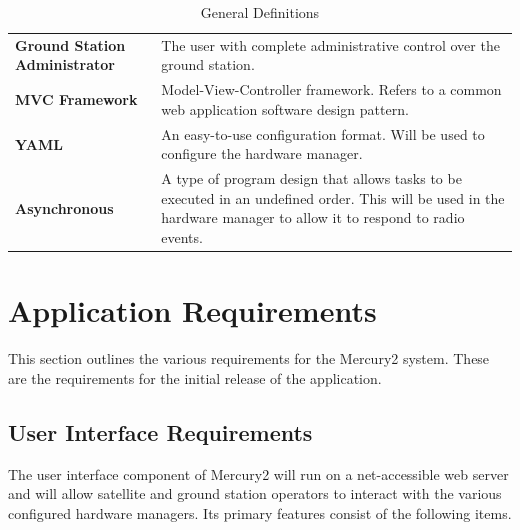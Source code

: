 \documentclass{mxl-design}
\begin{document}
\begin{table}[h]
{\begin{tabular}{ p{5cm} p{10cm} }
		\textbf{Ground Station Administrator} & The user with complete administrative control over the ground station.\\[.2cm]
		\textbf{MVC Framework} & Model-View-Controller framework. Refers to a common web application software design pattern.\\[.2cm]
		\textbf{YAML} & An easy-to-use configuration format. Will be used to configure the hardware manager.\\[.2cm]
		\textbf{Asynchronous} & A type of program design that allows tasks to be executed in an undefined order. This will be used in the hardware manager to allow it to respond to radio events.
	\end{tabular}}
	\caption{General Definitions}
	\label{tab:Mercury2 Definitions}
\end{table}

\clearpage
\section{Application Requirements}
This section outlines the various requirements for the Mercury2 system. These are the requirements for the initial release of the application.

\subsection{User Interface Requirements}
The user interface component of Mercury2 will run on a net-accessible web server and will allow satellite and ground station operators to interact with the various configured hardware managers. Its primary features consist of the following items.
\end{document}
